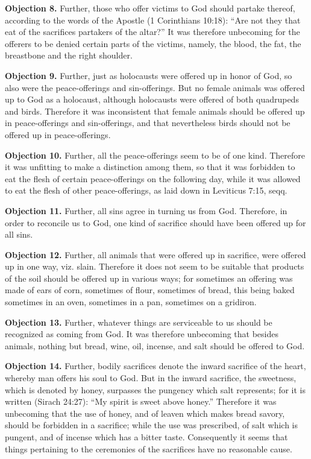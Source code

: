 \textbf{Objection 8.} Further, those who offer victims to God should partake thereof, according to the words of the Apostle (1 Corinthians 10:18): ``Are not they that eat of the sacrifices partakers of the altar?'' It was therefore unbecoming for the offerers to be denied certain parts of the victims, namely, the blood, the fat, the breastbone and the right shoulder.

\textbf{Objection 9.} Further, just as holocausts were offered up in honor of God, so also were the peace-offerings and sin-offerings. But no female animals was offered up to God as a holocaust, although holocausts were offered of both quadrupeds and birds. Therefore it was inconsistent that female animals should be offered up in peace-offerings and sin-offerings, and that nevertheless birds should not be offered up in peace-offerings.

\textbf{Objection 10.} Further, all the peace-offerings seem to be of one kind. Therefore it was unfitting to make a distinction among them, so that it was forbidden to eat the flesh of certain peace-offerings on the following day, while it was allowed to eat the flesh of other peace-offerings, as laid down in Leviticus 7:15, seqq.

\textbf{Objection 11.} Further, all sins agree in turning us from God. Therefore, in order to reconcile us to God, one kind of sacrifice should have been offered up for all sins.

\textbf{Objection 12.} Further, all animals that were offered up in sacrifice, were offered up in one way, viz. slain. Therefore it does not seem to be suitable that products of the soil should be offered up in various ways; for sometimes an offering was made of ears of corn, sometimes of flour, sometimes of bread, this being baked sometimes in an oven, sometimes in a pan, sometimes on a gridiron.

\textbf{Objection 13.} Further, whatever things are serviceable to us should be recognized as coming from God. It was therefore unbecoming that besides animals, nothing but bread, wine, oil, incense, and salt should be offered to God.

\textbf{Objection 14.} Further, bodily sacrifices denote the inward sacrifice of the heart, whereby man offers his soul to God. But in the inward sacrifice, the sweetness, which is denoted by honey, surpasses the pungency which salt represents; for it is written (Sirach 24:27): ``My spirit is sweet above honey.'' Therefore it was unbecoming that the use of honey, and of leaven which makes bread savory, should be forbidden in a sacrifice; while the use was prescribed, of salt which is pungent, and of incense which has a bitter taste. Consequently it seems that things pertaining to the ceremonies of the sacrifices have no reasonable cause.

